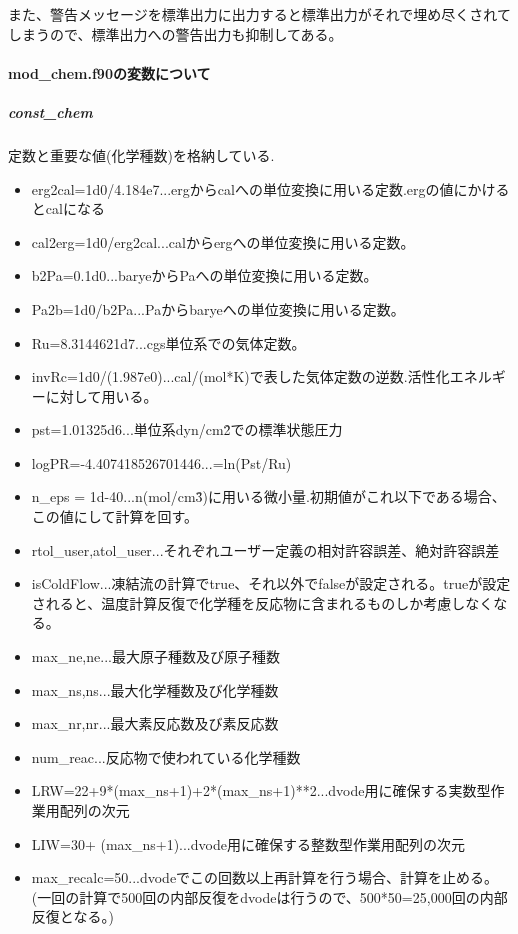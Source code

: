 \documentclass{jsarticle}
\begin{document}
また、警告メッセージを標準出力に出力すると標準出力がそれで埋め尽くされてしまうので、標準出力への警告出力も抑制してある。

\paragraph{mod\_chem.f90の変数について}%
\subparagraph{const\_chem}定数と重要な値(化学種数)を格納している.
\begin{itemize}
\item erg2cal=1d0/4.184e7...ergからcalへの単位変換に用いる定数.ergの値にかけるとcalになる
\item cal2erg=1d0/erg2cal...calからergへの単位変換に用いる定数。
\item b2Pa=0.1d0...baryeからPaへの単位変換に用いる定数。
\item Pa2b=1d0/b2Pa...Paからbaryeへの単位変換に用いる定数。
\item Ru=8.3144621d7...cgs単位系での気体定数。
\item invRc=1d0/(1.987e0)...cal/(mol*K)で表した気体定数の逆数.活性化エネルギーに対して用いる。
\item pst=1.01325d6...単位系dyn/cm\^2での標準状態圧力
\item logPR=-4.407418526701446...=ln(Pst/Ru)
\item n\_eps = 1d-40...n(mol/cm\^3)に用いる微小量.初期値がこれ以下である場合、この値にして計算を回す。
\item rtol\_user,atol\_user...それぞれユーザー定義の相対許容誤差、絶対許容誤差
\item isColdFlow...凍結流の計算でtrue、それ以外でfalseが設定される。trueが設定されると、温度計算反復で化学種を反応物に含まれるものしか考慮しなくなる。
\item max\_ne,ne...最大原子種数及び原子種数
\item max\_ns,ns...最大化学種数及び化学種数
\item max\_nr,nr...最大素反応数及び素反応数
\item num\_reac...反応物で使われている化学種数
\item LRW=22+9*(max\_ns+1)+2*(max\_ns+1)**2...dvode用に確保する実数型作業用配列の次元
\item LIW=30+  (max\_ns+1)...dvode用に確保する整数型作業用配列の次元
\item max\_recalc=50...dvodeでこの回数以上再計算を行う場合、計算を止める。(一回の計算で500回の内部反復をdvodeは行うので、500*50=25,000回の内部反復となる。)
\end{itemize}
\end{document}
